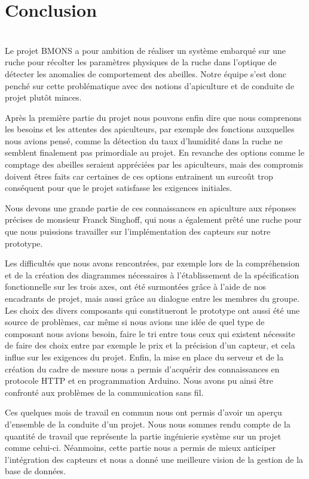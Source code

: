 \chapter{Conclusion}\\
Le projet BMONS a pour ambition de réaliser un système embarqué sur une ruche pour récolter les paramètres physiques de la ruche dans l’optique de détecter les anomalies de comportement des abeilles. Notre équipe s’est donc penché sur cette problématique avec des notions d’apiculture et de conduite de projet plutôt minces.

Après la première partie du projet nous pouvons enfin dire que nous comprenons les besoins et les attentes des apiculteurs, par exemple des fonctions auxquelles nous avions pensé, comme la détection du taux d'humidité dans la ruche ne semblent finalement pas primordiale au projet. En revanche des options comme le comptage des abeilles seraient appréciées par les apiculteurs, mais des compromis doivent êtres faits car certaines de ces options entrainent un surcoût trop conséquent pour que le projet satisfasse les exigences initiales.\newline 

Nous devons une grande partie de ces connaissances en apiculture aux réponses précises de monsieur Franck Singhoff, qui nous a également prêté une ruche pour que nous puissions travailler sur l'implémentation des capteurs sur notre prototype. \newline 

Les difficultés que nous avons rencontrées, par exemple lors de la compréhension et de la création des diagrammes nécessaires à l'établissement de la spécification fonctionnelle sur les trois axes, ont été surmontées grâce à l’aide de nos encadrants de projet, mais aussi grâce au dialogue entre les membres du groupe. Les choix des divers composants qui constitueront le prototype ont aussi été une source de problèmes, car même si nous avions une idée de quel type de composant nous avions besoin, faire le tri entre tous ceux qui existent nécessite de faire des choix entre par exemple le prix et la précision d’un capteur, et cela influe sur les exigences du projet. Enfin, la mise en place du serveur et de la création du cadre de mesure nous a permis d'acquérir des connaissances en protocole HTTP et en programmation Arduino. Nous avons pu ainsi être confronté aux problèmes de la communication sans fil.\newline

Ces quelques mois de travail en commun nous ont permis d'avoir un aperçu d'ensemble de la conduite d'un projet. Nous nous sommes rendu compte de la quantité de travail que représente la partie ingénierie système sur un projet comme celui-ci. Néanmoins, cette partie nous a permis de mieux anticiper l'intégration des capteurs et nous a donné une meilleure vision de la gestion de la base de données. 


